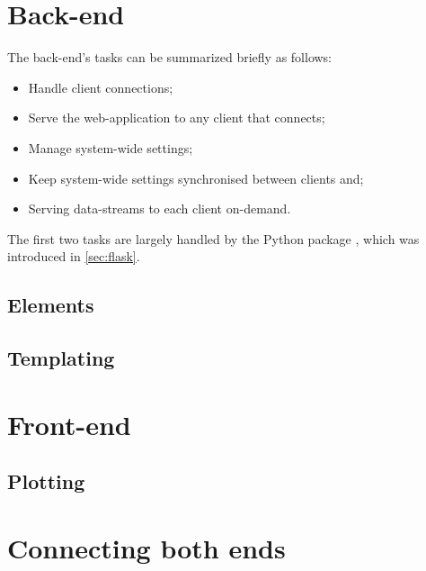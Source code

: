 \documentclass[a4paper, openany, oneside]{memoir}
\begin{document}
\section{Back-end}
\label{sec:webserver}
The back-end's tasks can be summarized briefly as follows:

\begin{itemize}
	\item Handle client connections;
	\item Serve the web-application to any client that connects;
	\item Manage system-wide settings;
	\item Keep system-wide settings synchronised between clients and;
	\item Serving data-streams to each client on-demand.
\end{itemize}

The first two tasks are largely handled by the Python package , which was introduced in \cref{sec:flask}.

\subsection{Elements}
\label{sec:elements}

\subsection{Templating}
\label{sec:templating}

\section{Front-end}
\label{sec:clientside}

\subsection{Plotting}
\label{sec:plotting}

\section{Connecting both ends}
\label{sec:websockets}
\end{document}
